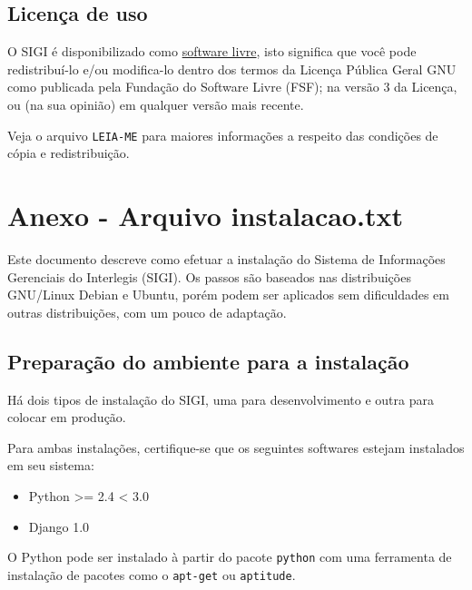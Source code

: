 \hypertarget{licen-a-de-uso}{}
\subsection*{Licença de uso}

O SIGI é disponibilizado como \href{http://pt.wikipedia.org/wiki/Software_Livre}{software livre}, isto significa que
você pode redistribuí-lo e/ou modifica-lo dentro dos termos da Licença
Pública Geral GNU como publicada pela Fundação do Software Livre
(FSF); na versão 3 da Licença, ou (na sua opinião) em qualquer versão
mais recente.

Veja o arquivo \texttt{LEIA-ME} para maiores informações a respeito das
condições de cópia e redistribuição.

\section{Anexo - Arquivo instalacao.txt}
\label{sec:a3}
Este documento descreve como efetuar a instalação do Sistema de
Informações Gerenciais do Interlegis (SIGI). Os passos são baseados
nas distribuições GNU/Linux Debian e Ubuntu, porém podem ser aplicados
sem dificuldades em outras distribuições, com um pouco de adaptação.



\hypertarget{prepara-o-do-ambiente-para-a-instala-o}{}
\subsection*{Preparação do ambiente para a instalação}

Há dois tipos de instalação do SIGI, uma para desenvolvimento e outra
para colocar em produção.

Para ambas instalações, certifique-se que os seguintes softwares
estejam instalados em seu sistema:
\begin{itemize}
\item {} 
Python {\textgreater}= 2.4 {\textless} 3.0

\item {} 
Django 1.0

\end{itemize}

O Python pode ser instalado à partir do pacote \texttt{python} com uma
ferramenta de instalação de pacotes como o \texttt{apt-get} ou
\texttt{aptitude}.

